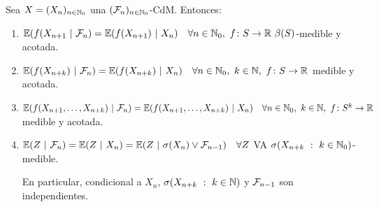 \begin{theorem}
	Sea $X = (X_{n})_{n \in \mathbb{N}_{0}}$ una $(\mathcal{F}_{n})_{n \in \mathbb{N}_{0}}$-CdM. Entonces:
	\begin{enumerate}
		\item $\mathbb{E}(f(X_{n+1} \ | \ \mathcal{F}_{n}) = \mathbb{E}(f(X_{n+1}) \ | \ X_{n}) \quad \forall n \in \mathbb{N}_{0},\ f \colon S \to \mathbb{R} \ \beta(S)$-medible y acotada.

		\item $\mathbb{E}(f(X_{n+k}) \ | \ \mathcal{F}_{n}) = \mathbb{E}(f(X_{n+k}) \ | \ X_{n}) \quad \forall n \in \mathbb{N}_{0},\ k \in \mathbb{N},\ f \colon S \to \mathbb{R}$ medible y acotada.

		\item $\mathbb{E}(f(X_{n+1}, \dots, X_{n+k}) \ | \ \mathcal{F}_{n}) = \mathbb{E}(f(X_{n+1}, \dots, X_{n+k}) \ | \ X_{n}) \quad \forall n \in \mathbb{N}_{0},\ k \in \mathbb{N},\ f \colon S^{k} \to \mathbb{R}$ medible y acotada.

		\item $\mathbb{E}(Z \ | \ \mathcal{F}_{n}) = \mathbb{E}(Z \ | \ X_{n}) = \mathbb{E}(Z \ | \ \sigma(X_{n}) \vee \mathcal{F}_{n-1}) \quad \forall Z$ VA $\sigma(X_{n+k} \ : \ k \in \mathbb{N}_{0})$-medible. \par
		En particular, condicional a $X_{n}$, $\sigma(X_{n+k} \ : \ k \in \mathbb{N})$ y $\mathcal{F}_{n-1}$ son independientes.
	\end{enumerate}
\end{theorem}
